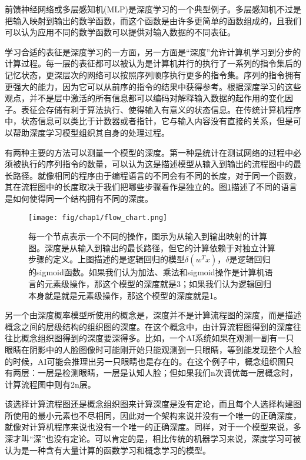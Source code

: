 前馈神经网络或多层感知机(MLP)是深度学习的一个典型例子。多层感知机不过是把输入映射到输出的数学函数，而这个函数是由许多更简单的函数组成的，且我们可以认为应用不同的数学函数可以提供对输入数据的不同表征。


学习合适的表征是深度学习的一方面，另一方面是“深度”允许计算机学习到分步的计算过程。每一层的表征都可以被认为是计算机并行的执行了一系列的指令集后的记忆状态，更深层次的网络可以按照序列顺序执行更多的指令集。序列的指令拥有更强大的能力，因为它可以从前序的指令的结果中获得参考。根据深度学习的这些观点，并不是层中激活的所有信息都可以编码对解释输入数据的起作用的变化因子。表征会存储有利于算法执行、使得输入有意义的状态信息。在传统计算机程序中，状态信息可以类比于计数器或者指针，它与输入内容没有直接的关系，但是可以帮助深度学习模型组织其自身的处理过程。


有两种主要的方法可以测量一个模型的深度。第一种是统计在测试网络的过程中必须被执行的序列指令的数量，可以认为这是描述模型从输入到输出的流程图中的最长路径。就像相同的程序由于编程语言的不同会有不同的长度，对于同一个函数，其在流程图中的长度取决于我们把哪些步骤看作是独立的。图\ref{fig:flow_chart}描述了不同的语言是如何使得同一个结构拥有不同的深度。

\begin{figure}[htbp] %
   \centering
   \texttt{[image: fig/chap1/flow\_chart.png]} 
   \caption{每一个节点表示一个不同的操作，图示为从输入到输出映射的计算图。深度是从输入到输出的最长路径，但它的计算依赖于对独立计算步骤的定义。上图描述的是逻辑回归的模型$\delta(w^Tx)$，$\delta$是逻辑回归的sigmoid函数。如果我们认为加法、乘法和sigmoid操作是计算机语言的元素级操作，那这个模型的深度就是3；如果我们认为逻辑回归本身就是就是元素级操作，那这个模型的深度就是1。}
   \label{fig:flow_chart}
\end{figure}


另一个由深度概率模型所使用的概念是，深度并不是计算流程图的深度，而是描述概念之间的层级结构的组织图的深度。在这个概念中，由计算流程图得到的深度往往比概念组织图得到的深度要深得多。比如，一个AI系统如果在观测一副有一只眼睛在阴影中的人脸图像时可能刚开始只能观测到一只眼睛，等到能发现整个人脸的时候，AI可能会推理出另一只眼睛也是存在的。在这个例子中，概念组织图只有两层：一层是检测眼睛，一层是认知人脸；但如果我们n次调优每一层概念时，计算流程图中则有2n层。


该选择计算流程图还是概念组织图来计算深度是没有定论，而且每个人选择构建图所使用的最小元素也不尽相同，因此对一个架构来说并没有一个唯一的正确深度，就像对计算机程序来说也没有一个唯一的正确深度。同样，对于一个模型来说，多深才叫“深”也没有定论。可以肯定的是，相比传统的机器学习来说，深度学习可被认为是一种含有大量计算的函数学习和概念学习的模型。

